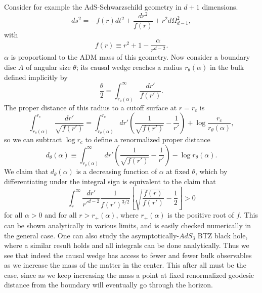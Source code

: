 \documentclass[12pt]{article}
\newcommand{\be}{\begin{equation}}
\newcommand{\ee}{\end{equation}}
\begin{document}
Consider for example the AdS-Schwarzschild geometry in $d+1$ dimensions.
\be
ds^2=-f(r)dt^2+\frac{dr^2}{f(r)}+r^2 d\Omega_{d-1}^2,
\ee
with 
\be
f(r)\equiv r^2+1-\frac{\alpha}{r^{d-2}}.
\ee
$\alpha$ is proportional to the ADM mass of this geometry.  Now consider a boundary disc $A$ of angular size $\theta$; its causal wedge reaches a radius $r_\theta(\alpha)$ in the bulk defined implicitly by
\be\label{rdef}
\frac{\theta}{2}=\int_{r_\theta(\alpha)}^\infty \frac{dr'}{f(r')}.
\ee
The proper distance of this radius to a cutoff surface at $r=r_c$ is 
\be
\int_{r_\theta(\alpha)}^{r_c}\frac{dr'}{\sqrt{f(r')}}=\int_{r_\theta(\alpha)}^{r_c}dr'\left(\frac{1}{\sqrt{f(r')}}-\frac{1}{r'}\right)+\log\frac{r_c}{r_\theta(\alpha)},
\ee
so we can subtract $\log r_c$  to define a renormalized proper distance
\be\label{ddef}
d_\theta(\alpha)\equiv \int_{r_\theta(\alpha)}^{\infty}dr'\left(\frac{1}{\sqrt{f(r')}}-\frac{1}{r'}\right)-\log r_\theta(\alpha).
\ee
We claim that $d_\theta(\alpha)$ is a decreasing function of $\alpha$ at fixed $\theta$, which by differentiating under the integral sign is equivalent to the claim that
\be
\int_{r}^\infty \frac{dr'}{r'^{d-2}}\frac{1}{f(r')^{3/2}}\left[\sqrt{\frac{f(r)}{f(r')}}-\frac{1}{2}\right]>0
\ee
for all $\alpha>0$ and for all $r>r_+(\alpha)$, where $r_+(\alpha)$ is the positive root of $f$.  This can be shown analytically in various limits, and is easily checked numerically in the general case.  One can also study the asymptotically-$AdS_3$ BTZ black hole, where a similar result holds and all integrals can be done analytically.  Thus we see that indeed the causal wedge has access to fewer and fewer bulk observables as we increase the mass of the matter in the center.  This after all must be the case, since as we keep increasing the mass a point at fixed renormalized geodesic distance from the boundary will eventually go through the horizon.
\end{document}
